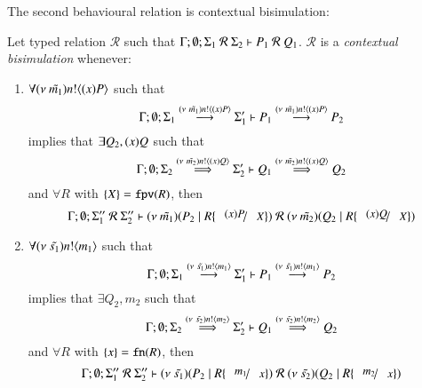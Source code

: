 The second behavioural relation is contextual bisimulation:
%
\begin{definition}\rm
	Let typed relation $\mathcal{R}$ such that $\Gamma; \emptyset; \Sigma_1\ \mathcal{R}\ \Sigma_2 \proves P_1\ \mathcal{R}\ Q_1$.
	$\mathcal{R}$ is a {\em contextual bisimulation} whenever:
	\begin{enumerate}
		\item	$\forall (\nu\ \tilde{m_1}) n ! \langle (x)P \rangle$ such that
			\[
				\Gamma; \emptyset; \Sigma_1 \stackrel{(\nu\ \tilde{m_1}) n ! \langle (x)P \rangle}{\longrightarrow} \Sigma_1' \vdash P_1 \stackrel{(\nu\ \tilde{m_1}) n ! \langle (x)P \rangle}{\longrightarrow} P_2
			\]
			implies that $\exists Q_2, (x)Q$ such that
			\[
				\Gamma; \emptyset; \Sigma_2 \stackrel{(\nu\ \tilde{m_2}) n ! \langle (x)Q \rangle}{\Longrightarrow} \Sigma_2' \vdash Q_1 \stackrel{(\nu\ \tilde{m_2}) n ! \langle (x)Q \rangle}{\Longrightarrow} Q_2
			\]
			and $\forall R$ with $\{X\} = \mathtt{fpv}(R)$, %
			then
			\[
				\Gamma; \emptyset; \Sigma_1''\ \mathcal{R}\ \Sigma_2'' \proves \newsp{\tilde{m_1}}{P_2 \Par R\subst{(x) P}{X}}
				\ \mathcal{R}\ 
				\newsp{\tilde{m_2}}{Q_2 \Par R\subst{(x) Q}{X}}
			\]
		\item	$\forall (\nu\ \tilde{s_1}) n ! \langle m_1 \rangle$ such that
			\[
				\Gamma; \emptyset; \Sigma_1 \stackrel{(\nu\ \tilde{s_1}) n ! \langle m_1 \rangle}{\longrightarrow} \Sigma_1' \vdash P_1 \stackrel{(\nu\ \tilde{s_1}) n ! \langle m_1 \rangle}{\longrightarrow} P_2
			\]
			implies that $\exists Q_2, m_2$ such that
			\[
				\Gamma; \emptyset; \Sigma_2 \stackrel{(\nu\ \tilde{s_2}) n ! \langle m_2 \rangle}{\Longrightarrow} \Sigma_2' \vdash Q_1 \stackrel{(\nu\ \tilde{s_2}) n ! \langle m_2 \rangle}{\Longrightarrow} Q_2
			\]
			and $\forall R$ with $\{x\} = \mathtt{fn}(R)$, %
			then
			\[
				\Gamma; \emptyset; \Sigma_1''\ \mathcal{R}\ \Sigma_2'' \proves \newsp{\tilde{s_1}}{P_2 \Par R \subst{m_1}{x}}
				\ \mathcal{R}\ 
				\newsp{\tilde{s_2}}{Q_2 \Par R \subst{m_2}{x}}
			\]


\end{enumerate}
\end{definition}
